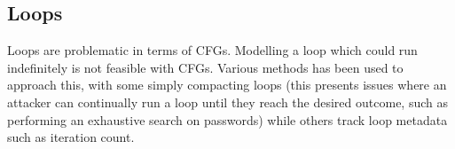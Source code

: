 
\subsection{Loops}
Loops are problematic in terms of CFGs. Modelling a loop which could run indefinitely is not feasible with CFGs. Various methods has been used to approach this, with some \cite{Abadi2005} simply compacting loops (this presents issues where an attacker can continually run a loop until they reach the desired outcome, such as performing an exhaustive search on passwords) while others \cite{Dessouky2017} track loop metadata such as iteration count.